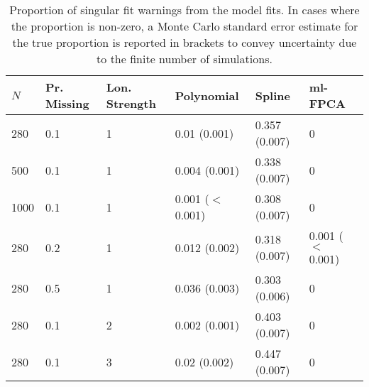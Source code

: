 \begin{table}[ht]
\centering
\begin{tabular}{llllll}
  \toprule
{\bfseries \small $N$} & {\bfseries \small Pr. Missing} & {\bfseries \small Lon. Strength} & {\bfseries \small Polynomial} & {\bfseries \small Spline} & {\bfseries \small ml-FPCA} \\ 
  \midrule
280 & 0.1 & 1 & 0.01 (0.001) & 0.357 (0.007) & 0 \\ 
  500 & 0.1 & 1 & 0.004 (0.001) & 0.338 (0.007) & 0 \\ 
  1000 & 0.1 & 1 & 0.001 ($<$ 0.001) & 0.308 (0.007) & 0 \\ 
  280 & 0.2 & 1 & 0.012 (0.002) & 0.318 (0.007) & 0.001 ($<$ 0.001) \\ 
  280 & 0.5 & 1 & 0.036 (0.003) & 0.303 (0.006) & 0 \\ 
  280 & 0.1 & 2 & 0.002 (0.001) & 0.403 (0.007) & 0 \\ 
  280 & 0.1 & 3 & 0.02 (0.002) & 0.447 (0.007) & 0 \\ 
   \bottomrule
\end{tabular}
\caption{Proportion of singular fit warnings from the model fits. In cases where the proportion is non-zero, a Monte Carlo standard error estimate for the true proportion is reported in brackets to convey uncertainty due to the finite number of simulations.} 
\label{tab:singularity-table}
\end{table}
